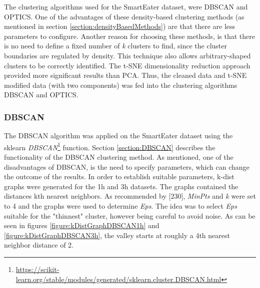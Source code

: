 The clustering algorithms used for the SmartEater dataset, were DBSCAN and OPTICS. One of the advantages of these density-based clustering methods (as mentioned in section \ref{section:densityBasedMethods}) are that there are less parameters to configure. Another reason for choosing these methods, is that there is no need to define a fixed number of \textit{k} clusters to find, since the cluster boundaries are regulated by density. This technique also allows arbitrary-shaped clusters to be correctly identified. The t-SNE dimensionality reduction approach provided more significant results than PCA. Thus, the cleaned data and t-SNE modified data (with two components) was fed into the clustering algorithms DBSCAN and OPTICS.

\subsubsection{DBSCAN}
The DBSCAN algorithm was applied on the SmartEater dataset using the sklearn \textit{DBSCAN}\footnote{\url{https://scikit-learn.org/stable/modules/generated/sklearn.cluster.DBSCAN.html}} function.
Section \ref{section:DBSCAN} describes the functionality of the DBSCAN clustering method. As mentioned, one of the disadvantages of DBSCAN, is the need to specify parameters, which can change the outcome of the results. In order to establish suitable parameters, k-dist graphs were generated for the 1h and 3h datasets. The graphs contained the distances kth nearest neighbors. As recommended by \textcite{DBSCAN}[230], \textit{MinPts} and \textit{k} were set to 4 and the graphs were used to determine \textit{Eps}. The idea was to select \textit{Eps} suitable for the "thinnest" cluster, however being careful to avoid noise. As can be seen in figures \ref{figure:kDistGraphDBSCAN1h} and \ref{figure:kDistGraphDBSCAN3h}, the valley starts at roughly a 4th nearest neighbor distance of 2. 




